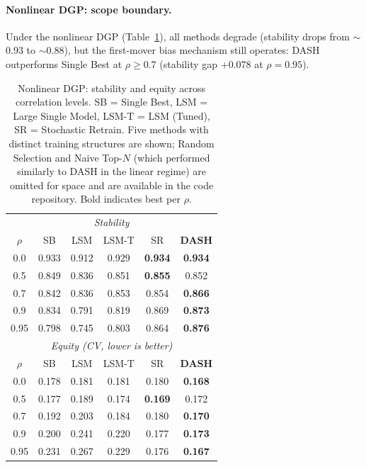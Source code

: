 \documentclass[11pt]{article}
\newcommand{\dash}{\textsc{DASH}}
\newcommand{\rhovar}{\rho}
\begin{document}
\paragraph{Nonlinear DGP: scope boundary.}
Under the nonlinear DGP (Table~\ref{tab:nonlinear}), all methods
degrade (stability drops from $\sim$0.93 to $\sim$0.88), but the
first-mover bias mechanism still operates: \dash{} outperforms Single
Best at $\rhovar \geq 0.7$ (stability gap $+0.078$ at $\rhovar = 0.95$).

\begin{table}[htbp]
\centering
\caption{Nonlinear DGP: stability and equity across correlation levels.
SB = Single Best, LSM = Large Single Model, LSM-T = LSM (Tuned),
SR = Stochastic Retrain.
Five methods with distinct training structures are shown; Random Selection
and Naive Top-$N$ (which performed similarly to \dash{} in the linear regime)
are omitted for space and are available in the code repository.
Bold indicates best per $\rhovar$.}
\label{tab:nonlinear}
\begin{tabular}{cccccc}
\toprule
\multicolumn{6}{c}{\textit{Stability}} \\
$\rhovar$ & SB & LSM & LSM-T & SR & \textbf{DASH} \\
\midrule
0.0  & 0.933 & 0.912 & 0.929 & \textbf{0.934} & \textbf{0.934} \\
0.5  & 0.849 & 0.836 & 0.851 & \textbf{0.855} & 0.852 \\
0.7  & 0.842 & 0.836 & 0.853 & 0.854 & \textbf{0.866} \\
0.9  & 0.834 & 0.791 & 0.819 & 0.869 & \textbf{0.873} \\
0.95 & 0.798 & 0.745 & 0.803 & 0.864 & \textbf{0.876} \\
\midrule
\multicolumn{6}{c}{\textit{Equity (CV, lower is better)}} \\
$\rhovar$ & SB & LSM & LSM-T & SR & \textbf{DASH} \\
\midrule
0.0  & 0.178 & 0.181 & 0.181 & 0.180 & \textbf{0.168} \\
0.5  & 0.177 & 0.189 & 0.174 & \textbf{0.169} & 0.172 \\
0.7  & 0.192 & 0.203 & 0.184 & 0.180 & \textbf{0.170} \\
0.9  & 0.200 & 0.241 & 0.220 & 0.177 & \textbf{0.173} \\
0.95 & 0.231 & 0.267 & 0.229 & 0.176 & \textbf{0.167} \\
\bottomrule
\end{tabular}
\end{table}
\end{document}
